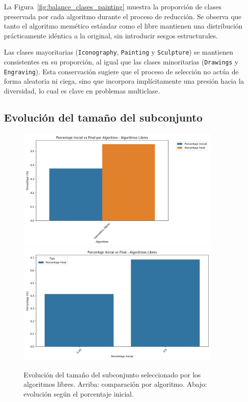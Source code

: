 La Figura~\ref{fig:balance_clases_painting} muestra la proporción de clases preservada por cada algoritmo durante el proceso de reducción.
Se observa que tanto el algoritmo memético estándar como el libre mantienen una distribución prácticamente idéntica a la original,
sin introducir sesgos estructurales.

Las clases mayoritarias (\texttt{Iconography}, \texttt{Painting} y \texttt{Sculpture}) se mantienen consistentes en su proporción,
al igual que las clases minoritarias (\texttt{Drawings} y \texttt{Engraving}).
Esta conservación sugiere que el proceso de selección no actúa de forma aleatoria ni ciega,
sino que incorpora implícitamente una presión hacia la diversidad, lo cual es clave en problemas multiclase.

\subsection{Evolución del tamaño del subconjunto}
\begin{figure}[H]
    \centering
    \includegraphics[width=0.9\textwidth]{imagenes/evaluaciones/painting/porcentaje-inical-vs-final-por-algoritmo}
    \vspace{1em}
    \includegraphics[width=0.9\textwidth]{imagenes/evaluaciones/painting/porcentaje-inicial-vs-final-por-pi}
    \caption{Evolución del tamaño del subconjunto seleccionado por los algoritmos libres.
        Arriba: comparación por algoritmo.
        Abajo: evolución según el porcentaje inicial.
    }
    \label{fig:evolucion_porcentaje_libre}
\end{figure}

